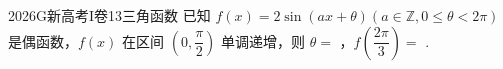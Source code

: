 
\begin{problem}{2026}{G}{新高考I卷}{13}{三角函数}
已知 $ f(x)=2\sin(ax+\theta)(a\in\mathbb{Z},0\leqslant\theta<2\pi) $ 是偶函数，$ f(x) $ 在区间 $ \left(0,\dfrac{\pi}{2}\right) $ 单调递增，则 $ \theta= $ \underline{\hspace{4em}}，$ f\left(\dfrac{2\pi}{3}\right)= $ \underline{\hspace{4em}}.
\end{problem}

\begin{answer}
\end{answer}

\begin{solutions}
\end{solutions}